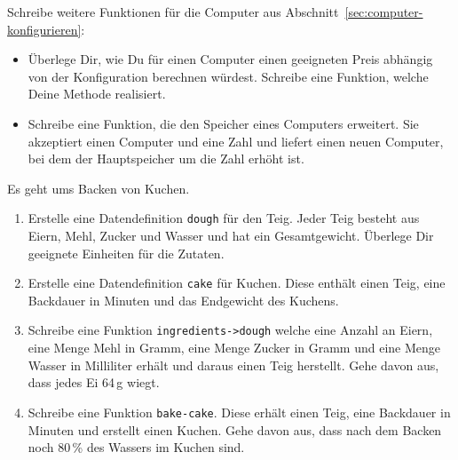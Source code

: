 \begin{aufgabe}

  Schreibe weitere Funktionen für die Computer aus Abschnitt~\ref{sec:computer-konfigurieren}:
  \begin{itemize}
  \item Überlege Dir, wie Du für einen Computer einen
    geeigneten Preis abhängig von der Konfiguration berechnen würdest.
    Schreibe eine Funktion, welche Deine Methode realisiert.
  \item Schreibe eine Funktion, die den Speicher eines Computers
    erweitert.  Sie akzeptiert einen Computer und eine Zahl und liefert
    einen neuen Computer, bei dem der Hauptspeicher um die Zahl erhöht
    ist.
  \end{itemize}
\end{aufgabe}

\begin{aufgabe}

  Es geht ums Backen von Kuchen.

  \begin{enumerate}
  \item Erstelle eine Datendefinition
    \lstinline{dough} für den Teig.  Jeder Teig besteht aus Eiern, Mehl,
    Zucker und Wasser und hat ein Gesamtgewicht.  Überlege Dir
    geeignete Einheiten für die Zutaten.
  \item Erstelle eine Datendefinition \lstinline{cake}
    für Kuchen.  Diese enthält einen Teig, eine Backdauer in Minuten und 
    das Endgewicht des Kuchens.
  \item Schreibe eine Funktion
    \lstinline{ingredients->dough} welche eine Anzahl an Eiern, eine
    Menge Mehl in Gramm, eine Menge Zucker in Gramm und eine
    Menge Wasser in Milliliter erhält und daraus einen Teig
    herstellt. Gehe davon aus, dass jedes Ei 64\,g wiegt.
  \item Schreibe eine Funktion \lstinline{bake-cake}. 
    Diese erhält einen Teig, eine Backdauer in Minuten und erstellt einen 
    Kuchen.  Gehe davon aus, dass nach dem Backen noch 80\,\% des
    Wassers im Kuchen sind.
  \end{enumerate}
  
\end{aufgabe}


